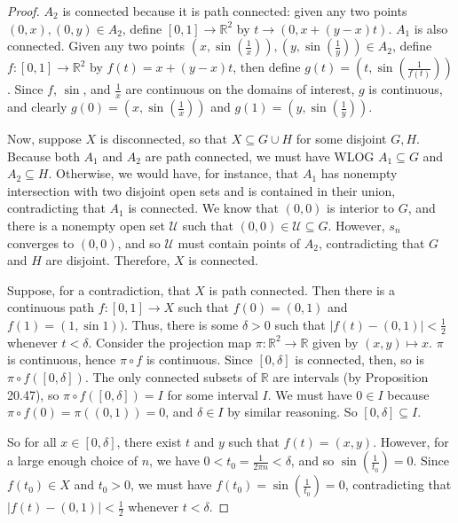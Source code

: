 \documentclass[10pt]{article}
\newcommand{\R}{\mathbb{R}}
\newcommand{\U}{\mathcal{U}}
\begin{document}
\begin{enumerate}
\begin{enumerate}
\begin{proof}
$A_2$ is connected because it is path connected: given any two points $(0,x), (0,y) \in A_2$, define $[0,1] \rightarrow \R^2$ by $t \rightarrow (0, x + (y-x)t)$.  $A_1$ is also connected.  Given any two points $(x, \sin(\frac1x)), (y,\sin(\frac1y)) \in A_2$, define $f:[0,1] \rightarrow \R^2$ by $f(t) = x + (y-x)t$, then define $g(t) = (t,\sin(\frac{1}{f(t)}))$.  Since $f$, $\sin$, and $\frac{1}{x}$ are continuous on the domains of interest, $g$ is continuous, and clearly $g(0) = (x, \sin(\frac1x))$ and $g(1) = (y,\sin(\frac1y))$.

Now, suppose $X$ is disconnected, so that $X \subseteq G \cup H$ for some disjoint $G, H$.  Because both $A_1$ and $A_2$ are path connected, we must have WLOG $A_1 \subseteq G$ and $A_2 \subseteq H$.  Otherwise, we would have, for instance, that $A_1$ has nonempty intersection with two disjoint open sets and is contained in their union, contradicting that $A_1$ is connected.  We know that $(0,0)$ is interior to $G$, and there is a nonempty open set $\U$ such that $(0,0) \in \U \subseteq G$.  However, $s_n$ converges to $(0,0)$, and so $\U$ must contain points of $A_2$, contradicting that $G$ and $H$ are disjoint.  Therefore, $X$ is connected.

Suppose, for a contradiction, that $X$ is path connected.  Then there is a continuous path $f:[0,1] \rightarrow X$ such that $f(0) = (0,1)$ and $f(1) = (1,\sin 1))$.  Thus, there is some $\delta > 0$ such that $|f(t) - (0,1)| < \frac12$ whenever $t < \delta$.  Consider the projection map $\pi: \R^2 \rightarrow \R$ given by $(x,y) \mapsto x$.  $\pi$ is continuous, hence $\pi \circ f$ is continuous.  Since $[0,\delta]$ is connected, then, so is $\pi \circ f([0,\delta])$.  The only connected subsets of $\R$ are intervals (by Proposition 20.47), so $\pi \circ f([0,\delta]) = I$ for some interval $I$.  We must have $0 \in I$ because $\pi \circ f (0) = \pi ((0,1)) = 0$, and $\delta \in I$ by similar reasoning.  So $[0,\delta] \subseteq I$.

So for all $x \in [0,\delta]$, there exist $t$ and $y$ such that $f(t) = (x,y)$.  However, for a large enough choice of $n$, we have $0 < t_0 = \frac{1}{2\pi n} < \delta$, and so $\sin(\frac{1}{t_0}) = 0$.  Since $f(t_0) \in X$ and $t_0 > 0$, we must have $f(t_0) = \sin(\frac{1}{t_0}) = 0$, contradicting that $|f(t) - (0,1)| < \frac12$ whenever $t < \delta$.

\end{proof}

\end{enumerate}


\end{enumerate}
\end{document}
